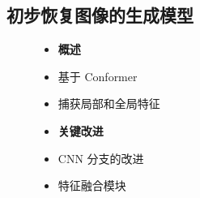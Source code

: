 \documentclass[CJK,aspectratio=169]{beamer}  %
\begin{document}
	\subsection{初步恢复图像的生成模型}
	
	\begin{frame}
		\begin{figure}
			\centering
			\begin{minipage}{.4\textwidth}
				\centering
				\small
				\begin{itemize} 
					\item \textbf{概述}
					
					\item[\checkmark]\small 基于 Conformer
					
					\item[\checkmark]\small 捕获局部和全局特征
					
				\end{itemize}
				\begin{itemize} 
					\item \textbf{关键改进}
					
					\item[\checkmark]\small CNN 分支的改进
					
					
					\item[\checkmark]\small 特征融合模块
					

\end{itemize}
\end{minipage}
\end{figure}
\end{frame}
\end{document}
